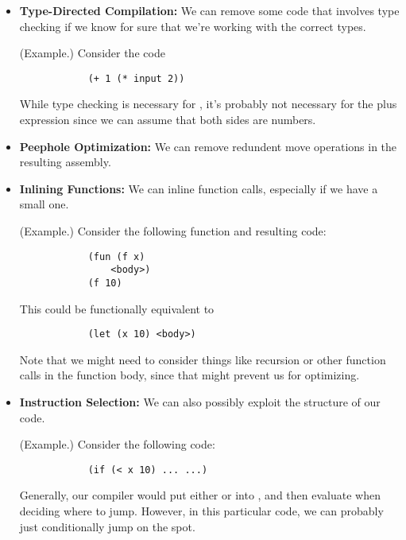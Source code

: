 \documentclass[letterpaper]{article}
\begin{document}
\begin{itemize}
    \item \textbf{Type-Directed Compilation:} We can remove some code that involves type checking if we know for sure that we're working with the correct types. 
    \begin{mdframed}
        (Example.) Consider the code 
        \begin{verbatim}
            (+ 1 (* input 2))\end{verbatim}
        While type checking is necessary for , it's probably not necessary for the plus expression since we can assume that both sides are numbers.
    \end{mdframed}

    \item \textbf{Peephole Optimization:} We can remove redundent move operations in the resulting assembly. 
    
    \item \textbf{Inlining Functions:} We can inline function calls, especially if we have a small one. 
    \begin{mdframed}
        (Example.) Consider the following function and resulting code: 
        \begin{verbatim}
            (fun (f x)
                <body>)
            (f 10)\end{verbatim}
        This could be functionally equivalent to  
        \begin{verbatim}
            (let (x 10) <body>)\end{verbatim}
    \end{mdframed}
    Note that we might need to consider things like recursion or other function calls in the function body, since that might prevent us for optimizing. 

    \item \textbf{Instruction Selection:} We can also possibly exploit the structure of our code. 
    \begin{mdframed}
        (Example.) Consider the following code: 
        \begin{verbatim}
            (if (< x 10) ... ...)\end{verbatim}
        Generally, our compiler would put either  or  into , and then evaluate  when deciding where to jump. However, in this particular code, we can probably just conditionally jump on the spot.  
    \end{mdframed}
\end{itemize}
\end{document}

